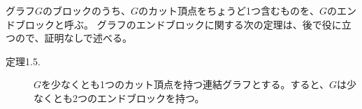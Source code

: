 
グラフ$G$のブロックのうち、$G$のカット頂点をちょうど1つ含むものを、$G$のエンドブロックと呼ぶ。
グラフのエンドブロックに関する次の定理は、後で役に立つので、証明なしで述べる。
\begin{description}
  \item[定理1.5.] $G$を少なくとも1つのカット頂点を持つ連結グラフとする。すると、$G$は少なくとも2つのエンドブロックを持つ。 
\end{description}